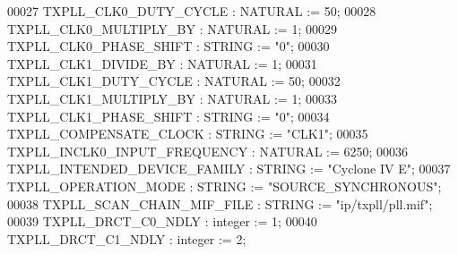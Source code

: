 \begin{DoxyCode}
00027       \textcolor{vhdlchar}{TXPLL_CLK0_DUTY_CYCLE}         \textcolor{vhdlchar}{:} \textcolor{comment}{NATURAL}   \textcolor{vhdlchar}{:=} \textcolor{vhdllogic}{}\textcolor{vhdllogic}{50};
00028       \textcolor{vhdlchar}{TXPLL_CLK0_MULTIPLY_BY}        \textcolor{vhdlchar}{:} \textcolor{comment}{NATURAL}   \textcolor{vhdlchar}{:=} \textcolor{vhdllogic}{}\textcolor{vhdllogic}{1};
00029       \textcolor{vhdlchar}{TXPLL_CLK0_PHASE_SHIFT}        \textcolor{vhdlchar}{:} \textcolor{comment}{STRING}    \textcolor{vhdlchar}{:=} \textcolor{vhdllogic}{"0"};
00030       \textcolor{vhdlchar}{TXPLL_CLK1_DIVIDE_BY}          \textcolor{vhdlchar}{:} \textcolor{comment}{NATURAL}   \textcolor{vhdlchar}{:=} \textcolor{vhdllogic}{}\textcolor{vhdllogic}{1};
00031       \textcolor{vhdlchar}{TXPLL_CLK1_DUTY_CYCLE}         \textcolor{vhdlchar}{:} \textcolor{comment}{NATURAL}   \textcolor{vhdlchar}{:=} \textcolor{vhdllogic}{}\textcolor{vhdllogic}{50};
00032       \textcolor{vhdlchar}{TXPLL_CLK1_MULTIPLY_BY}        \textcolor{vhdlchar}{:} \textcolor{comment}{NATURAL}   \textcolor{vhdlchar}{:=} \textcolor{vhdllogic}{}\textcolor{vhdllogic}{1};
00033       \textcolor{vhdlchar}{TXPLL_CLK1_PHASE_SHIFT}        \textcolor{vhdlchar}{:} \textcolor{comment}{STRING}    \textcolor{vhdlchar}{:=} \textcolor{vhdllogic}{"0"};
00034       \textcolor{vhdlchar}{TXPLL_COMPENSATE_CLOCK}        \textcolor{vhdlchar}{:} \textcolor{comment}{STRING}    \textcolor{vhdlchar}{:=} \textcolor{keyword}{"CLK1"};
00035       \textcolor{vhdlchar}{TXPLL_INCLK0_INPUT_FREQUENCY}  \textcolor{vhdlchar}{:} \textcolor{comment}{NATURAL}   \textcolor{vhdlchar}{:=} \textcolor{vhdllogic}{}\textcolor{vhdllogic}{6250};
00036       \textcolor{vhdlchar}{TXPLL_INTENDED_DEVICE_FAMILY}  \textcolor{vhdlchar}{:} \textcolor{comment}{STRING}    \textcolor{vhdlchar}{:=} \textcolor{keyword}{"Cyclone IV E"};
00037       \textcolor{vhdlchar}{TXPLL_OPERATION_MODE}          \textcolor{vhdlchar}{:} \textcolor{comment}{STRING}    \textcolor{vhdlchar}{:=} \textcolor{keyword}{"SOURCE\_SYNCHRONOUS"};
00038       \textcolor{vhdlchar}{TXPLL_SCAN_CHAIN_MIF_FILE}     \textcolor{vhdlchar}{:} \textcolor{comment}{STRING}    \textcolor{vhdlchar}{:=} \textcolor{keyword}{"ip/txpll/pll.mif"};
00039       \textcolor{vhdlchar}{TXPLL_DRCT_C0_NDLY}            \textcolor{vhdlchar}{:} \textcolor{comment}{integer}   \textcolor{vhdlchar}{:=} \textcolor{vhdllogic}{}\textcolor{vhdllogic}{1};
00040       \textcolor{vhdlchar}{TXPLL_DRCT_C1_NDLY}            \textcolor{vhdlchar}{:} \textcolor{comment}{integer}   \textcolor{vhdlchar}{:=} \textcolor{vhdllogic}{}\textcolor{vhdllogic}{2};

\end{DoxyCode}
